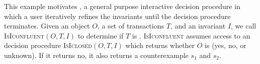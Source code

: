 This example motivates , a general
purpose interactive \Iconfluence{} decision procedure in which a user
iteratively refines the invariants until the decision procedure terminates.
Given an object $O$, a set of transactions $T$, and an invariant $I$, we call
\textsc{IsIconfluent}$(O, T, I)$ to determine if $T$ is \Iconfluent{}.
\textsc{IsIconfluent} assumes access to an \Iclosed{} decision procedure
\textsc{IsIclosed}$(O, T, I)$ which returns whether $O$ is \Iconfluent{} (yes,
no, or unknown). If it returns no, it also returns a counterexample $s_1$ and
$s_2$.

